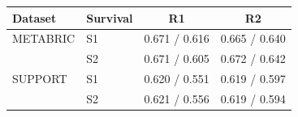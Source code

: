 \begin{tabular}{llcc}
\toprule
Dataset & Survival & R1 & R2 \\
\midrule
METABRIC & S1 & 0.671 / 0.616 & 0.665 / 0.640 \\
 & S2 & 0.671 / 0.605 & 0.672 / 0.642 \\
SUPPORT & S1 & 0.620 / 0.551 & 0.619 / 0.597 \\
 & S2 & 0.621 / 0.556 & 0.619 / 0.594 \\
\bottomrule
\end{tabular}
